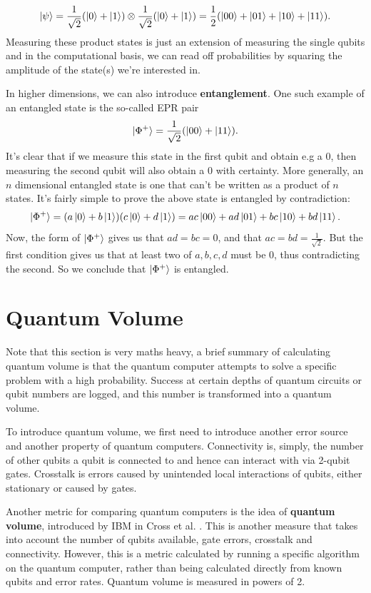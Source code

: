 \documentclass{article}
\theoremstyle{definition}
\begin{document}
\[
\ket{\psi} = \frac{1}{\sqrt{2}} (\ket{0} + \ket{1})  \otimes \frac{1}{\sqrt{2}} (\ket{0} + \ket{1}) = \frac{1}{2} (\ket{00} + \ket{01} + \ket{10} + \ket{11}).
\]
Measuring these product states is just an extension of measuring the single qubits and in the computational basis, we can read off probabilities by squaring the amplitude of the state(s) we're interested in. 

In higher dimensions, we can also introduce \textbf{entanglement}. One such example of an entangled state is the so-called EPR pair
\[
\ket{\Phi^+} = \frac{1}{\sqrt{2}}( \ket{00} + \ket{11}).
\]
It's clear that if we measure this state in the first qubit and obtain e.g a 0, then measuring the second qubit will also obtain a 0 with certainty. More generally, an $n$ dimensional entangled state is one that can't be written as a product of $n$ states. It's fairly simple to prove the above state is entangled by contradiction:
\[
\ket{\Phi^+} = (a \ket{0} + b \ket{1}) ( c \ket{0} + d \ket{1}) = ac \ket{00} + ad \ket{01} + bc \ket{10} + bd \ket{11}.
\]
Now, the form of $\ket{\Phi^+}$ gives us that $ad = bc = 0$, and that $ac = bd = \frac{1}{\sqrt{2}}$. But the first condition gives us that at least two of $a,b,c,d$ must be $0$, thus contradicting the second. So we conclude that $\ket{\Phi^+}$ is entangled. 



\section{Quantum Volume}
Note that this section is very maths heavy, a brief summary of calculating quantum volume is that the quantum computer attempts to solve a specific problem with a high probability. Success at certain depths of quantum circuits or qubit numbers are logged, and this number is transformed into a quantum volume. 

To introduce quantum volume, we first need to introduce another error source and another property of quantum computers. Connectivity is, simply, the number of other qubits a qubit is connected to and hence can interact with via 2-qubit gates. Crosstalk is errors caused by unintended local interactions of qubits, either stationary or caused by gates. 

Another metric for comparing quantum computers is the idea of \textbf{quantum volume}, introduced by IBM in Cross et al. \cite{Cross_2019}. This is another measure that takes into account the number of qubits available, gate errors, crosstalk and connectivity. However, this is a metric calculated by running a specific algorithm on the quantum computer, rather than being calculated directly from known qubits and error rates. Quantum volume is measured in powers of 2. 
\end{document}
